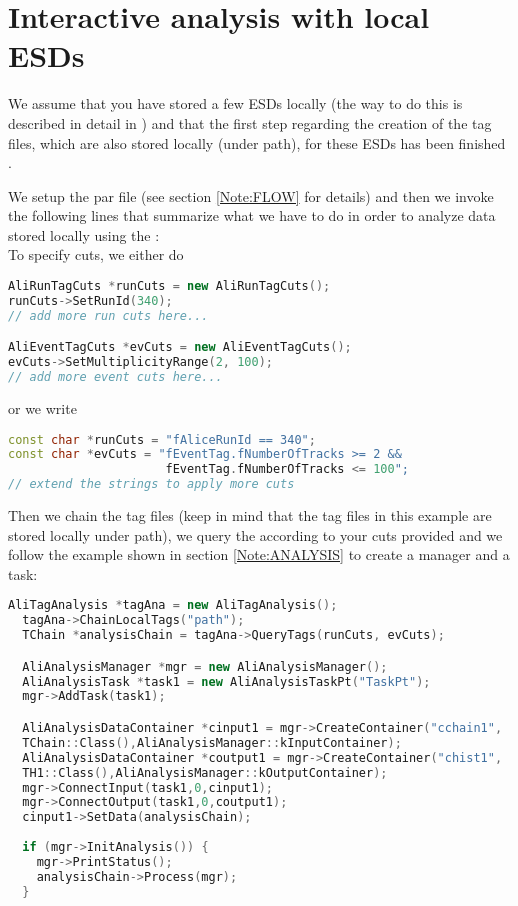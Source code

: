 \section{Interactive analysis with local ESDs}
\label{Note:LOCAL}

We assume that you have stored a few ESDs locally (the way to do this is described in detail in \cite{Note:RefAlienTutorial}) and that the first step regarding the creation of the tag files, which are also stored locally (under {\ttfamily path}), for these ESDs has been finished \cite{Note:RefEventTagNote}.

We setup the {\ttfamily par file} (see section \ref{Note:FLOW} for details) and then we invoke the following lines that summarize what we have to do  in order to analyze data stored locally using the \tag:\\

To specify cuts, we either do
\begin{lstlisting}[language=C++]
AliRunTagCuts *runCuts = new AliRunTagCuts();
runCuts->SetRunId(340);
// add more run cuts here...

AliEventTagCuts *evCuts = new AliEventTagCuts();
evCuts->SetMultiplicityRange(2, 100);
// add more event cuts here...
\end{lstlisting}
or we write
\begin{lstlisting}[language=C++]
const char *runCuts = "fAliceRunId == 340";
const char *evCuts = "fEventTag.fNumberOfTracks >= 2 &&
                      fEventTag.fNumberOfTracks <= 100";
// extend the strings to apply more cuts
\end{lstlisting}

Then we chain the tag files (keep in mind that the tag files in this example are stored locally under {\ttfamily path}), we query the \tag according to your cuts provided and we follow the example shown in section \ref{Note:ANALYSIS} to create a manager and a task:
\begin{lstlisting}[language=C++]
  AliTagAnalysis *tagAna = new AliTagAnalysis();
  tagAna->ChainLocalTags("path");
  TChain *analysisChain = tagAna->QueryTags(runCuts, evCuts);

  AliAnalysisManager *mgr = new AliAnalysisManager();
  AliAnalysisTask *task1 = new AliAnalysisTaskPt("TaskPt");
  mgr->AddTask(task1);

  AliAnalysisDataContainer *cinput1 = mgr->CreateContainer("cchain1",
  TChain::Class(),AliAnalysisManager::kInputContainer);
  AliAnalysisDataContainer *coutput1 = mgr->CreateContainer("chist1", 
  TH1::Class(),AliAnalysisManager::kOutputContainer);
  mgr->ConnectInput(task1,0,cinput1);
  mgr->ConnectOutput(task1,0,coutput1);
  cinput1->SetData(analysisChain);
  
  if (mgr->InitAnalysis()) {
    mgr->PrintStatus();
    analysisChain->Process(mgr);
  }

\end{lstlisting}

